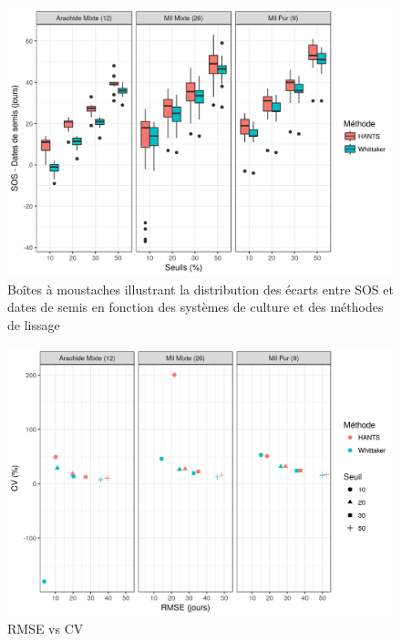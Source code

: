 \begin{figure}[htbp]
 \begin{center}
  \includegraphics[scale=0.7]{resultats_discussions/SOS_Boxplot.png} 
 \end{center}
 \caption[Distribution des écarts entre SOS et dates de semis]{Boîtes à moustaches illustrant la distribution des écarts entre SOS et dates de semis en fonction des systèmes de culture et des méthodes de lissage}
 \label{fig-sosboxplot}
\end{figure}

\begin{figure}[htbp]
 \begin{center}
  \includegraphics[scale=0.7]{resultats_discussions/SOS_RMSE_vs_CV.png} 
 \end{center}
 \caption{RMSE vs CV}
 \label{fig-sos-rmse-cv}
\end{figure}

